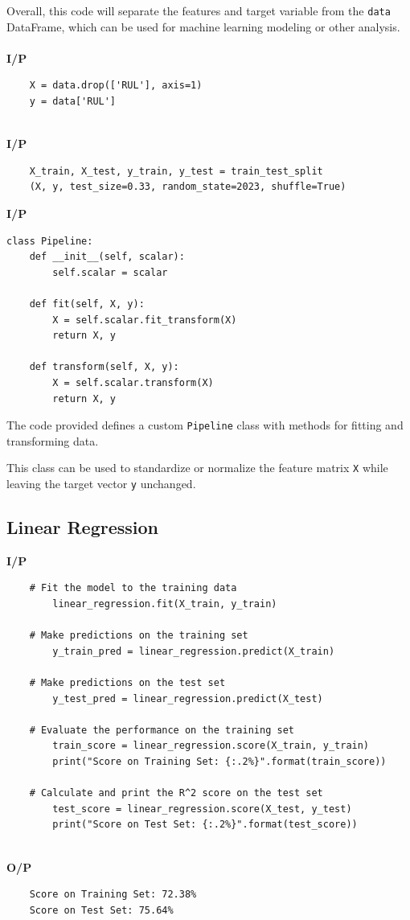 Overall, this code will separate the features and target variable from the \texttt{data} DataFrame, which can be used for machine learning modeling or other analysis.\\
\\
\noindent
\textbf{I/P} \\[-1.5em]
\begin{verbatim}
    X = data.drop(['RUL'], axis=1)
    y = data['RUL']
\end{verbatim}
\noindent
\\
\textbf{I/P} \\[-1.5em] %
\begin{verbatim}
    X_train, X_test, y_train, y_test = train_test_split
    (X, y, test_size=0.33, random_state=2023, shuffle=True)
\end{verbatim}
\newpage
\noindent
\textbf{I/P} \\[-1.5em]
\begin{verbatim}
class Pipeline:
    def __init__(self, scalar):
        self.scalar = scalar

    def fit(self, X, y):
        X = self.scalar.fit_transform(X)
        return X, y

    def transform(self, X, y):
        X = self.scalar.transform(X)
        return X, y
\end{verbatim}

The code provided defines a custom \texttt{Pipeline} class with methods for fitting and transforming data.

This class can be used to standardize or normalize the feature matrix \texttt{X} while leaving the target vector \texttt{y} unchanged.

\subsection{Linear Regression}
\noindent
\textbf{I/P} \\[-1.5em] 
\begin{verbatim}
    # Fit the model to the training data
        linear_regression.fit(X_train, y_train)

    # Make predictions on the training set
        y_train_pred = linear_regression.predict(X_train)

    # Make predictions on the test set
        y_test_pred = linear_regression.predict(X_test)

    # Evaluate the performance on the training set
        train_score = linear_regression.score(X_train, y_train)
        print("Score on Training Set: {:.2%}".format(train_score))

    # Calculate and print the R^2 score on the test set
        test_score = linear_regression.score(X_test, y_test)
        print("Score on Test Set: {:.2%}".format(test_score))
\end{verbatim}
\\
\noindent
\textbf{O/P} \\[-2.5em]
\begin{verbatim}
    Score on Training Set: 72.38% 
    Score on Test Set: 75.64% 
\end{verbatim}

